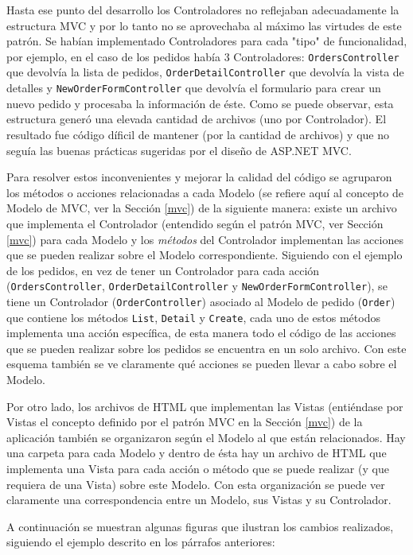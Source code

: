 Hasta ese punto del desarrollo los Controladores no reflejaban adecuadamente la estructura MVC y por lo tanto no se aprovechaba al máximo las virtudes de este patrón. Se habían implementado Controladores para cada "tipo" de funcionalidad, por ejemplo, en el caso de los pedidos había 3 Controladores: \texttt{OrdersController} que devolvía la lista de pedidos, \texttt{OrderDetailController} que devolvía la vista de detalles y \texttt{NewOrderFormContro\-ller} que devolvía el formulario para crear un nuevo pedido y procesaba la información de éste. Como se puede observar, esta estructura generó una elevada cantidad de archivos (uno por Controlador). El resultado fue código díficil de mantener (por la cantidad de archivos) y que no seguía las buenas prácticas sugeridas por el diseño de ASP.NET MVC.

Para resolver estos inconvenientes y mejorar la calidad del código se agruparon los métodos o acciones relacionadas a cada Modelo (se refiere aquí al concepto de Modelo de MVC, ver la Sección \ref{mvc}) de la siguiente manera: existe un archivo que implementa el Controlador (entendido según el patrón MVC, ver Sección \ref{mvc}) para cada Modelo y los \emph{métodos} del Controlador implementan las acciones que se pueden realizar sobre el Modelo correspondiente. Siguiendo con el ejemplo de los pedidos, en vez de tener un Controlador para cada acción (\texttt{OrdersController}, \texttt{OrderDetailContro\-ller} y \texttt{NewOrderFormContro\-ller}), se tiene un Controlador (\texttt{OrderController}) asociado al Modelo de pedido (\texttt{Order}) que contiene los métodos \texttt{List}, \texttt{Detail} y \texttt{Create}, cada uno de estos métodos implementa una acción específica, de esta manera todo el código de las acciones que se pueden realizar sobre los pedidos se encuentra en un solo archivo. Con este esquema también se ve claramente qué acciones se pueden llevar a cabo sobre el Modelo.

Por otro lado, los archivos de HTML que implementan las Vistas (entiéndase por Vistas el concepto definido por el patrón MVC en la Sección \ref{mvc}) de la aplicación también se organizaron según el Modelo al que están relacionados. Hay una carpeta para cada Modelo y dentro de ésta hay un archivo de HTML que implementa una Vista para cada acción o método que se puede realizar (y que requiera de una Vista) sobre este Modelo. Con esta organización se puede ver claramente una correspondencia entre un Modelo, sus Vistas y su Controlador.

A continuación se muestran algunas figuras que ilustran los cambios realizados, siguiendo el ejemplo descrito en los párrafos anteriores:

